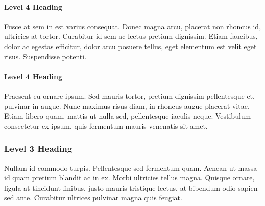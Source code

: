 \paragraph{Level 4 Heading}

Fusce at sem in est varius consequat. Donec magna arcu, placerat non rhoncus id, ultricies at tortor. Curabitur id sem ac lectus pretium dignissim. Etiam faucibus, dolor ac egestas efficitur, dolor arcu posuere tellus, eget elementum est velit eget risus. Suspendisse potenti.

\paragraph{Level 4 Heading}

Praesent eu ornare ipsum. Sed mauris tortor, pretium dignissim pellentesque et, pulvinar in augue. Nunc maximus risus diam, in rhoncus augue placerat vitae. Etiam libero quam, mattis ut nulla sed, pellentesque iaculis neque. Vestibulum consectetur ex ipsum, quis fermentum mauris venenatis sit amet.

\subsubsection{Level 3 Heading}

Nullam id commodo turpis. Pellentesque sed fermentum quam. Aenean ut massa id quam pretium blandit ac in ex. Morbi ultricies tellus magna. Quisque ornare, ligula at tincidunt finibus, justo mauris tristique lectus, at bibendum odio sapien sed ante. Curabitur ultrices pulvinar magna quis feugiat.

